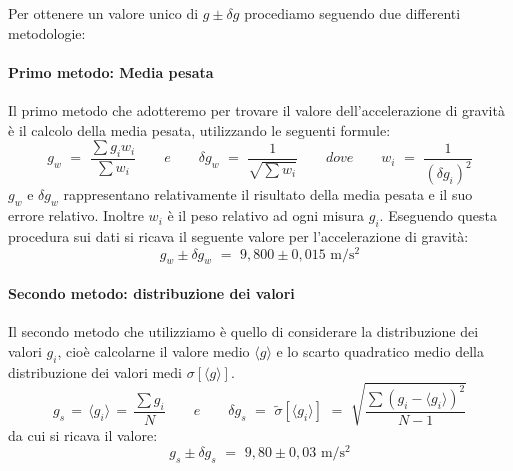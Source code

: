Per ottenere un valore unico di $g \pm \delta g$ procediamo seguendo due differenti metodologie:

\paragraph{Primo metodo: Media pesata\\}

Il primo metodo che adotteremo per trovare il valore dell'accelerazione di gravità è il calcolo della media pesata, utilizzando le seguenti formule:
\begin{equation}
	g_w \,\, = \,\, \frac{\sum g_iw_i}{\sum w_i} \quad\quad e \quad\quad \delta g_w \,\, = \,\, \frac{1}{\sqrt{\sum w_i}} \quad\quad dove \quad\quad w_i \,\, = \,\, \frac{1}{(\delta g_i)^2}
\end{equation}
%
$g_w$ e $\delta g_w$ rappresentano relativamente il risultato della media pesata e il suo errore relativo. Inoltre $w_i$ è il peso relativo ad ogni misura $g_i$.
Eseguendo questa procedura sui dati si ricava il seguente valore per l'accelerazione di gravità:
\begin{equation}
	g_w \pm \delta g_w \,\, = \,\, 9,800 \pm 0,015 \,\, \si{\metre\per\square\second}
\end{equation}

\paragraph{Secondo metodo: distribuzione dei valori\\}

Il secondo metodo che utilizziamo è quello di considerare la distribuzione dei valori $g_i$, cioè calcolarne il valore medio $\langle g\rangle$ e lo scarto quadratico medio della distribuzione dei valori medi $\sigma[\langle g \rangle]$.
\begin{equation}
	g_s \, = \, \langle g_i \rangle \, = \, \frac{\sum g_i}{N} \quad\quad 	e	\quad\quad	\delta g_s \,\, = \,\, \tilde{\sigma}[\langle g_i \rangle] \,\, = \,\, \sqrt{\frac{\sum (g_i - \langle g_i \rangle)^2}{N-1}}
\end{equation}
%
da cui si ricava il valore:
\begin{equation}
	g_s \pm \delta g_s \,\, = \,\, 9,80 \pm 0,03 \,\, \si{\metre\per\square\second}
\end{equation}

